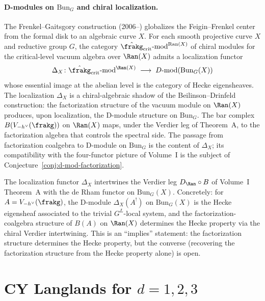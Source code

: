\paragraph{D-modules on \texorpdfstring{$\mathrm{Bun}_G$}{Bun-G} and chiral localization.}
The Frenkel--Gaitsgory construction (2006--) globalizes the Feigin--Frenkel center from the formal disk to an algebraic curve $X$. For each smooth projective curve $X$ and reductive group $G$, the category $\hat{\frakg}_{\mathrm{crit}}\text{-}\mathrm{mod}^{\mathrm{Ran}(X)}$ of chiral modules for the critical-level vacuum algebra over $\Ran(X)$ admits a localization functor
\[
 \Delta_X \colon \hat{\frakg}_{\mathrm{crit}}\text{-}\mathrm{mod}^{\Ran(X)} \;\longrightarrow\; D\text{-}\mathrm{mod}(\mathrm{Bun}_G(X))
\]
whose essential image at the abelian level is the category of Hecke eigensheaves. The localization $\Delta_X$ is a chiral-algebraic shadow of the Beilinson--Drinfeld construction: the factorization structure of the vacuum module on $\Ran(X)$ produces, upon localization, the D-module structure on $\mathrm{Bun}_G$. The bar complex $B(V_{-h^\vee}(\frakg))$ on $\Ran(X)$ maps, under the Verdier leg of Theorem~A, to the factorization algebra that controls the spectral side. The passage from factorization coalgebra to D-module on $\mathrm{Bun}_G$ is the content of $\Delta_X$; its compatibility with the four-functor picture of Volume~I is the subject of Conjecture~\ref{conj:d-mod-factorization}.

\begin{conjecture}
\label{conj:d-mod-factorization}
\ClaimStatusConjectured
The localization functor $\Delta_X$ intertwines the Verdier leg $D_{\Ran} \circ B$ of Volume~I Theorem~A with the de Rham functor on $\mathrm{Bun}_G(X)$. Concretely: for $A = V_{-h^\vee}(\frakg)$, the D-module $\Delta_X(A^!)$ on $\mathrm{Bun}_G(X)$ is the Hecke eigensheaf associated to the trivial $G^L$-local system, and the factorization-coalgebra structure of $B(A)$ on $\Ran(X)$ determines the Hecke property via the chiral Verdier intertwining. This is an ``implies'' statement: the factorization structure determines the Hecke property, but the converse (recovering the factorization structure from the Hecke property alone) is open.
\end{conjecture}


\section{CY Langlands for \texorpdfstring{$d = 1, 2, 3$}{d = 1, 2, 3}}
\label{sec:cy-langlands}

